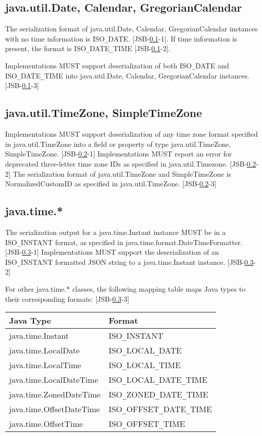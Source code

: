 \subsection{java.util.Date, Calendar, GregorianCalendar}
\label{subsec:datecalendar}
The serialization format of java.util.Date, Calendar, GregorianCalendar instances with no time information is ISO\verb|_|DATE. [JSB-\ref{subsec:datecalendar}-1]. If time information is present, the format is ISO\verb|_|DATE\verb|_|TIME [JSB-\ref{subsec:datecalendar}-2].

Implementations MUST support deserialization of both ISO\verb|_|DATE and ISO\verb|_|DATE\verb|_|TIME into java.util.Date, Calendar, GregorianCalendar instances. [JSB-\ref{subsec:datecalendar}-3]

\subsection{java.util.TimeZone, SimpleTimeZone}
\label{subsec:dateTimezone}

Implementations MUST support deserialization of any time zone format specified in java.util.TimeZone into a field or property of type java.util.TimeZone, SimpleTimeZone. [JSB-\ref{subsec:dateTimezone}-1] 
Implementations MUST report an error for deprecated three-letter time zone IDs as specified in java.util.Timezone. [JSB-\ref{subsec:dateTimezone}-2]
The serialization format of java.util.TimeZone and SimpleTimeZone is NormalizedCustomID as specified in java.util.TimeZone. [JSB-\ref{subsec:dateTimezone}-3]

\subsection{java.time.*}
\label{subsec:time}

The serialization output for a java.time.Instant instance MUST be in a ISO\verb|_|INSTANT format, as specified in 
java.time.format.DateTimeFormatter. [JSB-\ref{subsec:time}-1]
Implementations MUST support the deserialization of an ISO\verb|_|INSTANT formatted JSON string to a java.time.Instant instance. [JSB-\ref{subsec:time}-2]

For other java.time.* classes, the following mapping table maps Java types to their corresponding formats: [JSB-\ref{subsec:time}-3]

\begin{tabularx}{\textwidth}{ |X|X| }
\hline
Java Type & Format \\ 
\hline
java.time.Instant & ISO\verb|_|INSTANT\\
java.time.LocalDate & ISO\verb|_|LOCAL\verb|_|DATE\\
java.time.LocalTime & ISO\verb|_|LOCAL\verb|_|TIME\\
java.time.LocalDateTime & ISO\verb|_|LOCAL\verb|_|DATE\verb|_|TIME\\
java.time.ZonedDateTime & ISO\verb|_|ZONED\verb|_|DATE\verb|_|TIME\\
java.time.OffsetDateTime & ISO\verb|_|OFFSET\verb|_|DATE\verb|_|TIME\\
java.time.OffsetTime & ISO\verb|_|OFFSET\verb|_|TIME\\
\hline
\end{tabularx}

